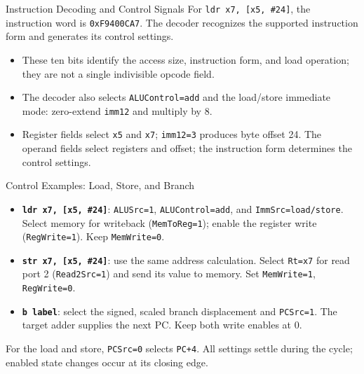 \documentclass[aspectratio=169,11pt,t]{beamer}
\newcommand{\key}[1]{\textbf{#1}}
\newcommand{\hex}[1]{\texttt{0x#1}}
\newcommand{\code}[1]{\texttt{#1}}
\begin{document}
\begin{frame}{Instruction Decoding and Control Signals}
\small
For \code{ldr x7, [x5, \#24]}, the instruction word is \hex{F9400CA7}.
The decoder recognizes the supported instruction form and generates its control settings.
\begin{center}
\end{center}
\begin{itemize}\setlength{\itemsep}{6pt}
\item These ten bits identify the access size, instruction form, and load operation; they are not a single indivisible opcode field.
\item The decoder also selects \code{ALUControl=add} and the load/store immediate mode: zero-extend \code{imm12} and multiply by 8.
\item Register fields select \code{x5} and \code{x7}; \code{imm12=3} produces byte offset 24. The operand fields select registers and offset; the instruction form determines the control settings.
\end{itemize}
\end{frame}

\begin{frame}{Control Examples: Load, Store, and Branch}
\small
\begin{itemize}\setlength{\itemsep}{10pt}
\item \key{\texttt{ldr x7, [x5, \#24]}}: \code{ALUSrc=1}, \code{ALUControl=add}, and \code{ImmSrc=load/store}. Select memory for writeback (\code{MemToReg=1}); enable the register write (\code{RegWrite=1}). Keep \code{MemWrite=0}.
\item \key{\texttt{str x7, [x5, \#24]}}: use the same address calculation. Select \code{Rt=x7} for read port 2 (\code{Read2Src=1}) and send its value to memory. Set \code{MemWrite=1}, \code{RegWrite=0}.
\item \key{\texttt{b label}}: select the signed, scaled branch displacement and \code{PCSrc=1}. The target adder supplies the next PC. Keep both write enables at 0.
\end{itemize}
\vspace{.12cm}
For the load and store, \code{PCSrc=0} selects \code{PC+4}. All settings settle during the cycle; enabled state changes occur at its closing edge.
\end{frame}
\end{document}
